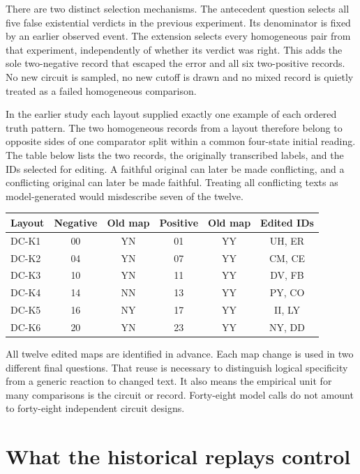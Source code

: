 \documentclass[12pt,letterpaper]{article}
\begin{document}
There are two distinct selection mechanisms. The antecedent question selects all five false existential verdicts in the previous experiment. Its denominator is fixed by an earlier observed event. The extension selects every homogeneous pair from that experiment, independently of whether its verdict was right. This adds the sole two-negative record that escaped the error and all six two-positive records. No new circuit is sampled, no new cutoff is drawn and no mixed record is quietly treated as a failed homogeneous comparison.

In the earlier study each layout supplied exactly one example of each ordered truth pattern. The two homogeneous records from a layout therefore belong to opposite sides of one comparator split within a common four-state initial reading. The table below lists the two records, the originally transcribed labels, and the IDs selected for editing. A faithful original can later be made conflicting, and a conflicting original can later be made faithful. Treating all conflicting texts as model-generated would misdescribe seven of the twelve.

\begin{center}\small\begin{tabular}{@{}lccccc@{}}\toprule
Layout & Negative & Old map & Positive & Old map & Edited IDs\\\midrule
DC-K1 & 00 & YN & 01 & YY & UH, ER\\
DC-K2 & 04 & YN & 07 & YY & CM, CE\\
DC-K3 & 10 & YN & 11 & YY & DV, FB\\
DC-K4 & 14 & NN & 13 & YY & PY, CO\\
DC-K5 & 16 & NY & 17 & YY & II, LY\\
DC-K6 & 20 & YN & 23 & YY & NY, DD\\\bottomrule\end{tabular}\end{center}

All twelve edited maps are identified in advance. Each map change is used in two different final questions. That reuse is necessary to distinguish logical specificity from a generic reaction to changed text. It also means the empirical unit for many comparisons is the circuit or record. Forty-eight model calls do not amount to forty-eight independent circuit designs.

\clearpage\section{What the historical replays control}
\end{document}
